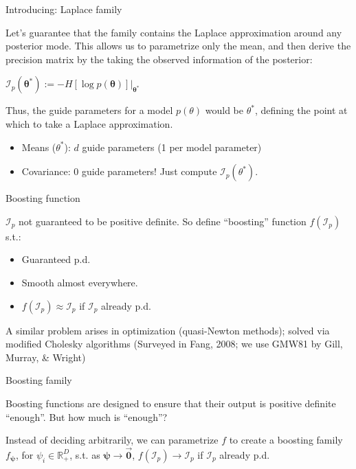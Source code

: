 \documentclass[
  ignorenonframetext,
]{beamer}
\providecommand{\tightlist}{%
  \setlength{\itemsep}{0pt}\setlength{\parskip}{0pt}}
\begin{document}
\begin{frame}{Introducing: Laplace family}
\protect\hypertarget{introducing-laplace-family}{}

Let's guarantee that the family contains the Laplace approximation
around any posterior mode. This allows us to parametrize only the mean,
and then derive the precision matrix by the taking the observed
information of the posterior:

\(\mathcal{I}_p\left(\bm{\theta}^*\right) := -H\left[\log p(\bm{\theta})\right]\bigg\rvert_{\bm{\theta}^*}\)

Thus, the guide parameters for a model \(p(\theta)\) would be
\(\theta^*\), defining the point at which to take a Laplace
approximation.

\begin{itemize}
\tightlist
\item
  Means (\(\theta^*\)): \(d\) guide parameters (1 per model parameter)
\item
  Covariance: 0 guide parameters! Just compute
  \(\mathcal{I}_p(\theta^*)\).
\end{itemize}

\end{frame}

\begin{frame}{Boosting function}
\protect\hypertarget{boosting-function}{}

\(\mathcal{I}_p\) not guaranteed to be positive definite. So define
``boosting'' function \(f(\mathcal{I}_p)\) s.t.:

\begin{itemize}
\tightlist
\item
  Guaranteed p.d.
\item
  Smooth almost everywhere.
\item
  \(f(\mathcal{I}_p)\approx\mathcal{I}_p\) if \(\mathcal{I}_p\) already
  p.d.
\end{itemize}

A similar problem arises in optimization (quasi-Newton methods); solved
via modified Cholesky algorithms (Surveyed in Fang, 2008; we use GMW81
by Gill, Murray, \& Wright)

\end{frame}

\begin{frame}{Boosting family}
\protect\hypertarget{boosting-family}{}

Boosting functions are designed to ensure that their output is positive
definite ``enough''. But how much is ``enough''?

Instead of deciding arbitrarily, we can parametrize \(f\) to create a
boosting family \(f_{\bm{\psi}}\), for \(\psi_i\in\mathbb{R}^D_+\), s.t.
as \(\bm{\psi}\rightarrow\vec{\bm{0}}\),
\(f(\mathcal{I}_p)\rightarrow\mathcal{I}_p\) if \(\mathcal{I}_p\)
already p.d.

\end{frame}
\end{document}
